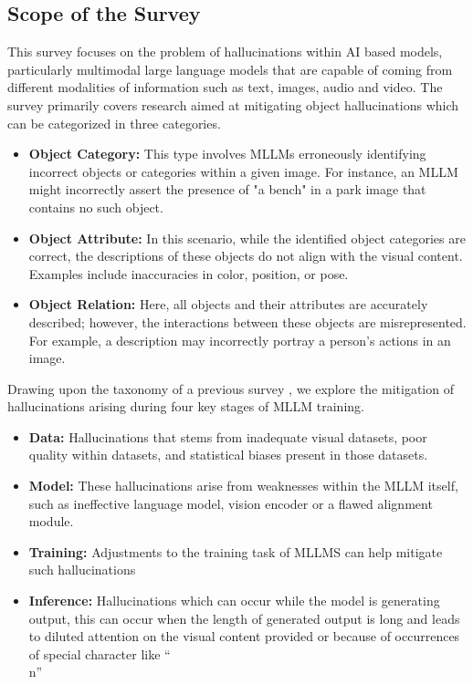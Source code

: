 \documentclass[twocolumn, 9pt]{extarticle}
\begin{document}
\subsection{Scope of the Survey}
This survey focuses on the problem of hallucinations within AI based models, particularly multimodal large language models that are capable of coming from different modalities of information such as text, images, audio and video. The survey primarily covers research aimed at mitigating object hallucinations which can be categorized in three categories. 

\begin{itemize}
    \item \textbf{Object Category:} This type involves MLLMs erroneously identifying incorrect objects or categories within a given image. For instance, an MLLM might incorrectly assert the presence of "a bench" in a park image that contains no such object.
    \item \textbf{Object Attribute:} In this scenario, while the identified object categories are correct, the descriptions of these objects do not align with the visual content. Examples include inaccuracies in color, position, or pose.
    \item \textbf{Object Relation:} Here, all objects and their attributes are accurately described; however, the interactions between these objects are misrepresented. For example, a description may incorrectly portray a person's actions in an image.
\end{itemize}

Drawing upon the taxonomy of a previous survey , we explore the mitigation of hallucinations arising during four key stages of MLLM training.
\begin{itemize}
    \item \textbf{Data:} Hallucinations that stems from inadequate visual datasets, poor quality within datasets, and statistical biases present in those datasets.
    \item \textbf{Model:} These hallucinations arise from weaknesses within the MLLM itself, such as ineffective language model, vision encoder or a flawed alignment module.
    \item \textbf{Training:} Adjustments to the training task of MLLMS can help mitigate such hallucinations
    \item \textbf{Inference:} Hallucinations which can occur while the model is generating output, this can occur when the length of generated output is long and leads to diluted attention on the visual content provided or because of occurrences of special character like “\\n”
\end{itemize}
\end{document}
